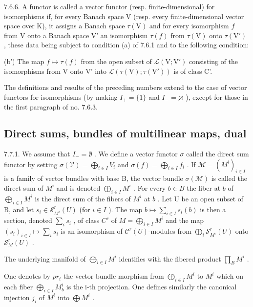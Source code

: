 7.6.6. A functor is called a vector functor (resp. finite-dimensional) for isomorphisms if, for every Banach space V (resp. every finite-dimensional vector space over K), it assigns a Banach space \(\tau(\mathrm{V})\) and for every isomorphism \(f\) from V onto a Banach space V' an isomorphism \(\tau(f)\) from \(\tau(\mathrm{V})\) onto \(\tau(\mathrm{V}')\) , these data being subject to condition (a) of 7.6.1 and to the following condition:

(b') The map \(f\mapsto\tau(f)\) from the open subset of \(\mathcal{L}(\mathrm{V};\mathrm{V}')\) consisting of the isomorphisms from V onto V' into \(\mathcal{L}(\tau(\mathrm{V});\tau(\mathrm{V}'))\) is of class C'.

The definitions and results of the preceding numbers extend to the case of vector functors for isomorphisms (by making \(I_{+} = \{1\}\) and \(I_{-} = \varnothing\) ), except for those in the first paragraph of no. 7.6.3.

\subsection{Direct sums, bundles of multilinear maps, dual}

7.7.1. We assume that \(I_{-} = \emptyset\) . We define a vector functor \(\sigma\) called the direct sum functor by setting \(\sigma(\mathcal{V}) = \bigoplus_{i \in I} V_i\) and \(\sigma(f) = \bigoplus_{i \in I} f_i\) . If \(\mathcal{M} = (M^i)_{i \in I}\) is a family of vector bundles with base B, the vector bundle \(\sigma(\mathcal{M})\) is called the direct sum of \(M^i\) and is denoted \(\bigoplus_{i \in I} M^i\) . For every \(b \in B\) the fiber at \(b\) of \(\bigoplus_{i \in I} M^i\) is the direct sum of the fibers of \(M^i\) at \(b\) . Let U be an open subset of B, and let \(s_i \in \mathscr{S}_{M^i}^r(U)\) (for \(i \in I\) ). The map \(b \mapsto \sum_{i \in I} s_i(b)\) is then a section, denoted \(\sum_{i} s_i\) , of class \(C^r\) of \(M = \bigoplus_{i \in I} M^i\) and the map \((s_i)_{i \in I} \mapsto \sum_{i} s_i\) is an isomorphism of \(\mathscr{C}^r(U)\)-modules from \(\bigoplus_{i} \mathscr{S}_{M^i}^r(U)\) onto \(\mathscr{S}_M^r(U)\) .

The underlying manifold of \(\bigoplus_{i\in I}M^{i}\) identifies with the fibered product \(\prod_{B}M^{i}\) .

One denotes by \(pr_{i}\) the vector bundle morphism from \(\bigoplus_{i\in I} M^{i}\) to \(M^{i}\) which on each fiber \(\bigoplus_{i\in I} M_{b}^{i}\) is the i-th projection. One defines similarly the canonical injection \(j_{i}\) of \(M^{i}\) into \(\bigoplus M^{i}\) .

